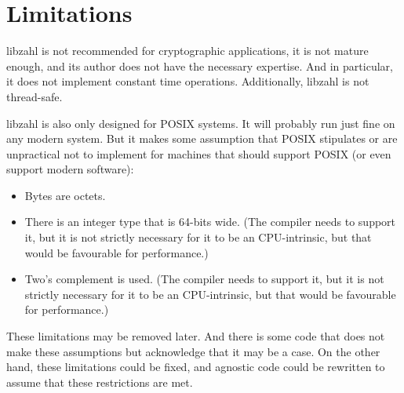 \newpage
\section{Limitations}
\label{sec:Limitations}

libzahl is not recommended for cryptographic
applications, it is not mature enough, and its author
does not have the necessary expertise. And in
particular, it does not implement constant time
operations. Additionally, libzahl is not thread-safe.

libzahl is also only designed for POSIX systems.
It will probably run just fine on any modern
system. But it makes some assumption that POSIX
stipulates or are unpractical not to implement
for machines that should support POSIX (or even
support modern software):

\begin{itemize}
\item
Bytes are octets.

\item
There is an integer type that is 64-bits wide.
(The compiler needs to support it, but it is not
strictly necessary for it to be an CPU-intrinsic,
but that would be favourable for performance.)

\item
Two's complement is used.
(The compiler needs to support it, but it is not
strictly necessary for it to be an CPU-intrinsic,
but that would be favourable for performance.)
\end{itemize}

These limitations may be removed later. And there
is some code that does not make these assumptions
but acknowledge that it may be a case. On the other
hand, these limitations could be fixed, and agnostic
code could be rewritten to assume that these
restrictions are met.
